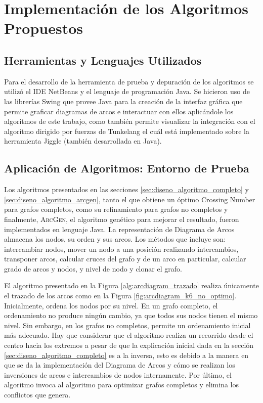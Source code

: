 \chapter{Implementación de los Algoritmos Propuestos}\label{cap4}

\section{Herramientas y Lenguajes Utilizados}
Para el desarrollo de la herramienta de prueba y depuración de los algoritmos se utilizó el IDE NetBeans y el lenguaje de programación Java. Se hicieron uso de las librerías Swing que provee Java para la creación de la interfaz gráfica que permite graficar diagramas de arcos e interactuar con ellos aplicándole los algoritmos de este trabajo, como también permite visualizar la integración con el algoritmo dirigido por fuerzas de Tunkelang el cuál está implementado sobre la herramienta Jiggle (también desarrollada en Java).

\section{Aplicación de Algoritmos: Entorno de Prueba}
Los algoritmos presentados en las secciones \ref{sec:diseno_algoritmo_completo} y \ref{sec:diseno_algoritmo_arcgen}, tanto el que obtiene un óptimo Crossing Number para grafos completos, como su refinamiento para grafos no completos y finalmente, \textsc{ArcGen}, el algoritmo genético para mejorar el resultado, fueron implementados en lenguaje Java. %
	La  representación de Diagrama de Arcos %
	almacena los nodos, su orden y sus arcos. Los métodos que incluye son: intercambiar nodos, mover un nodo a una posición realizando intercambios, transponer arcos, calcular cruces del grafo y de un arco en particular, calcular grado de arcos y nodos, y nivel de nodo y clonar el grafo.
	
    El algoritmo presentado en la Figura \ref{alg:arcdiagram_trazado}  realiza únicamente el trazado de los arcos como en la Figura \ref{fig:arcdiagram_k6_no_optimo}. Inicialmente,  ordena los nodos por su nivel. En  un grafo completo, el ordenamiento no produce ningún cambio, ya que todos sus nodos tienen el mismo nivel. Sin embargo, en los grafos no completos, permite un ordenamiento inicial más adecuado. Hay que considerar que el algoritmo realiza un recorrido desde el centro hacia los extremos a pesar de que la explicación inicial dada en la sección \ref{sec:diseno_algoritmo_completo} es a la inversa, esto es debido a la manera en que se da la implementación del Diagrama de Arcos y cómo se realizan los inversiones de arcos e intercambios de nodos internamente.
	Por último, el algoritmo invoca al algoritmo para optimizar grafos completos y elimina  los conflictos que genera.
	
